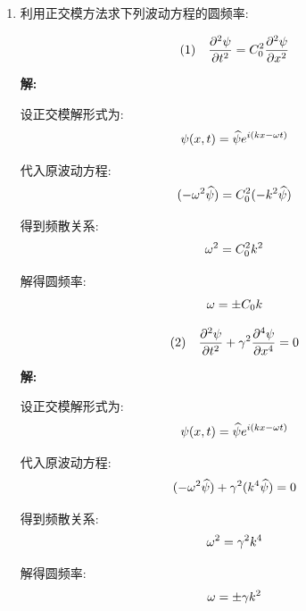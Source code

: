 \begin{enumerate}
    \qed

    \item 利用正交模方法求下列波动方程的圆频率:

    \begin{equation*}
        \text{(1)} \quad \pde[2]{\psi}{\timevar} = C_0^2 \pde[2]{\psi}{x}
    \end{equation*}

    \vspace{1em}
    \textbf{解:}

    设正交模解形式为:
    \begin{equation*}
        \psi(x, t) = \widehat{\psi} e^{i (k x - \omega t)}
    \end{equation*}

    代入原波动方程:
    \begin{equation*}
        (-\omega^2 \widehat{\psi}) = C_0^2 (-k^2 \widehat{\psi})
    \end{equation*}

    得到频散关系:
    \begin{equation*}
        \omega^2 = C_0^2 k^2
    \end{equation*}

    解得圆频率:
    \begin{equation*}
        \omega = \pm C_0 k
    \end{equation*}

    \begin{equation*}
    \text{(2)} \quad \pde[2]{\psi}{\timevar} + \gamma^2 \pde[4]{\psi}{x} = 0
    \end{equation*}

    \vspace{1em}
    \textbf{解:}

    设正交模解形式为:
    \begin{equation*}
        \psi(x, t) = \widehat{\psi} e^{i (k x - \omega t)}
    \end{equation*}

    代入原波动方程:
    \begin{equation*}
        (-\omega^2 \widehat{\psi}) + \gamma^2 (k^4 \widehat{\psi}) = 0
    \end{equation*}

    得到频散关系:
    \begin{equation*}
        \omega^2 = \gamma^2 k^4
    \end{equation*}

    解得圆频率:
    \begin{equation*}
        \omega = \pm \gamma k^2
    \end{equation*}


\end{enumerate}
